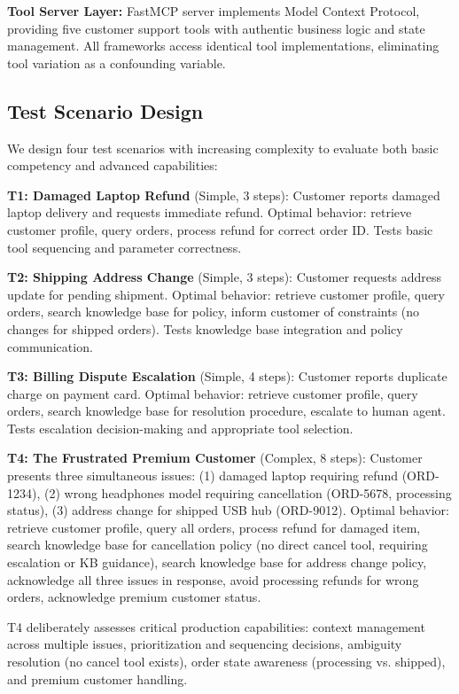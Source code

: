 \documentclass[sigconf,nonacm]{acmart}
\begin{document}
\textbf{Tool Server Layer:} FastMCP server implements Model Context Protocol, providing five customer support tools with authentic business logic and state management. All frameworks access identical tool implementations, eliminating tool variation as a confounding variable.

\subsection{Test Scenario Design}

We design four test scenarios with increasing complexity to evaluate both basic competency and advanced capabilities:

\textbf{T1: Damaged Laptop Refund} (Simple, 3 steps): Customer reports damaged laptop delivery and requests immediate refund. Optimal behavior: retrieve customer profile, query orders, process refund for correct order ID. Tests basic tool sequencing and parameter correctness.

\textbf{T2: Shipping Address Change} (Simple, 3 steps): Customer requests address update for pending shipment. Optimal behavior: retrieve customer profile, query orders, search knowledge base for policy, inform customer of constraints (no changes for shipped orders). Tests knowledge base integration and policy communication.

\textbf{T3: Billing Dispute Escalation} (Simple, 4 steps): Customer reports duplicate charge on payment card. Optimal behavior: retrieve customer profile, query orders, search knowledge base for resolution procedure, escalate to human agent. Tests escalation decision-making and appropriate tool selection.

\textbf{T4: The Frustrated Premium Customer} (Complex, 8 steps): Customer presents three simultaneous issues: (1) damaged laptop requiring refund (ORD-1234), (2) wrong headphones model requiring cancellation (ORD-5678, processing status), (3) address change for shipped USB hub (ORD-9012). Optimal behavior: retrieve customer profile, query all orders, process refund for damaged item, search knowledge base for cancellation policy (no direct cancel tool, requiring escalation or KB guidance), search knowledge base for address change policy, acknowledge all three issues in response, avoid processing refunds for wrong orders, acknowledge premium customer status.

T4 deliberately assesses critical production capabilities: context management across multiple issues, prioritization and sequencing decisions, ambiguity resolution (no cancel tool exists), order state awareness (processing vs. shipped), and premium customer handling.
\end{document}
